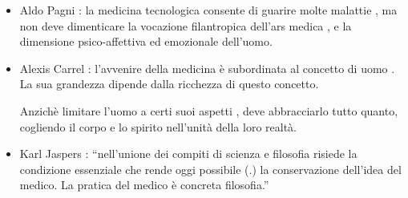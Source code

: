 \documentclass[]{article}
\begin{document}
\begin{itemize}
\item
  Aldo Pagni : la medicina tecnologica consente di guarire molte
  malattie , ma non deve dimenticare la vocazione filantropica dell'ars
  medica , e la dimensione psico-affettiva ed emozionale dell'uomo.
\item
  Alexis Carrel : l'avvenire della medicina è subordinata al concetto di
  uomo . La sua grandezza dipende dalla ricchezza di questo concetto.

  Anzichè limitare l'uomo a certi suoi aspetti , deve abbracciarlo tutto
  quanto, cogliendo il corpo e lo spirito nell'unità della loro realtà.
\item
  Karl Jaspers : ``nell'unione dei compiti di scienza e filosofia
  risiede la condizione essenziale che rende oggi possibile (.) la
  conservazione dell'idea del medico. La pratica del medico è concreta
  filosofia.''
\end{itemize}
\end{document}
